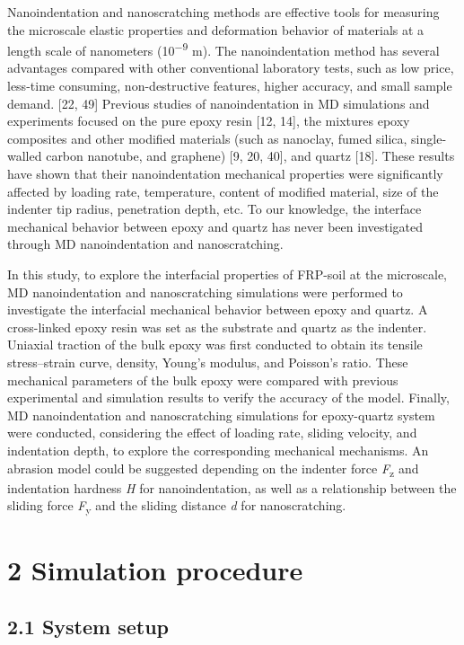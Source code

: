 \documentclass{article}
\begin{document}
Nanoindentation and nanoscratching methods are effective tools for measuring the microscale elastic properties and deformation behavior of materials at a length scale of nanometers (10\textsuperscript{−9} m). The nanoindentation method has several advantages compared with other conventional laboratory tests, such as low price, less-time consuming, non-destructive features, higher accuracy, and small sample demand. [22, 49] Previous studies of nanoindentation in MD simulations and experiments focused on the pure epoxy resin [12, 14], the mixtures epoxy composites and other modified materials (such as nanoclay, fumed silica, single-walled carbon nanotube, and graphene) [9, 20, 40], and quartz [18]. These results have shown that their nanoindentation mechanical properties were significantly affected by loading rate, temperature, content of modified material, size of the indenter tip radius, penetration depth, etc. To our knowledge, the interface mechanical behavior between epoxy and quartz has never been investigated through MD nanoindentation and nanoscratching.

In this study, to explore the interfacial properties of FRP-soil at the microscale, MD nanoindentation and nanoscratching simulations were performed to investigate the interfacial mechanical behavior between epoxy and quartz. A cross-linked epoxy resin was set as the substrate and quartz as the indenter. Uniaxial traction of the bulk epoxy was first conducted to obtain its tensile stress–strain curve, density, Young’s modulus, and Poisson’s ratio. These mechanical parameters of the bulk epoxy were compared with previous experimental and simulation results to verify the accuracy of the model. Finally, MD nanoindentation and nanoscratching simulations for epoxy-quartz system were conducted, considering the effect of loading rate, sliding velocity, and indentation depth, to explore the corresponding mechanical mechanisms. An abrasion model could be suggested depending on the indenter force \emph{F}\textsubscript{z} and indentation hardness \emph{H} for nanoindentation, as well as a relationship between the sliding force \emph{F}\textsubscript{y} and the sliding distance \emph{d} for nanoscratching.

\section*{2 Simulation procedure}

\subsection*{2.1 System setup}
\end{document}
